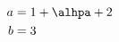 \documentclass{article}
\begin{document}
\begin{align*}
a &= 1+\alhpa+2 \\
b &= 3
\end{align*}
\end{document}
